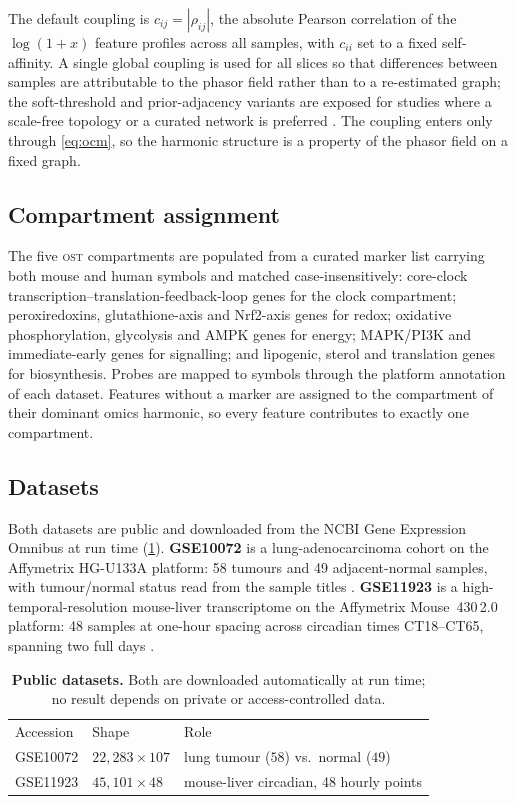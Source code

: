 \documentclass[preprint,12pt,amsmath,amssymb,superscriptaddress,floatfix]{revtex4-2}
\theoremstyle{definition}
\theoremstyle{plain}
\newcommand{\OST}{\textsc{ost}}
\begin{document}
The default coupling is $c_{ij}=|\rho_{ij}|$, the absolute Pearson correlation of
the $\log(1+x)$ feature profiles across all samples, with $c_{ii}$ set to a
fixed self-affinity. A single global coupling is used for all slices so that
differences between samples are attributable to the phasor field rather than to a
re-estimated graph; the soft-threshold and prior-adjacency variants are exposed
for studies where a scale-free topology or a curated network is preferred
\citep{langfelder2008wgcna, barabasi2011network}. The coupling enters only
through \cref{eq:ocm}, so the harmonic structure is a property of the phasor
field on a fixed graph.

\subsection{Compartment assignment}

The five \OST{} compartments are populated from a curated marker list carrying
both mouse and human symbols and matched case-insensitively: core-clock
transcription--translation-feedback-loop genes for the clock compartment;
peroxiredoxins, glutathione-axis and Nrf2-axis genes for redox; oxidative
phosphorylation, glycolysis and AMPK genes for energy; MAPK/PI3K and
immediate-early genes for signalling; and lipogenic, sterol and translation genes
for biosynthesis. Probes are mapped to symbols through the platform annotation of
each dataset. Features without a marker are assigned to the compartment of their
dominant omics harmonic, so every feature contributes to exactly one compartment.

\subsection{Datasets}

Both datasets are public and downloaded from the NCBI Gene Expression Omnibus
\citep{edgar2002geo} at run time (\cref{tab:data}). \textbf{GSE10072} is a
lung-adenocarcinoma cohort on the Affymetrix HG-U133A platform: 58 tumours and 49
adjacent-normal samples, with tumour/normal status read from the sample titles
\citep{landi2008gene}. \textbf{GSE11923} is a high-temporal-resolution
mouse-liver transcriptome on the Affymetrix Mouse~430\,2.0 platform: 48 samples
at one-hour spacing across circadian times CT18--CT65, spanning two full days
\citep{hughes2009harmonics}.

\begin{table}[htbp]
\centering
\caption{\textbf{Public datasets.} Both are downloaded automatically at run time;
no result depends on private or access-controlled data.}
\label{tab:data}
\small
\begin{ruledtabular}
\begin{tabular}{lll}
Accession & Shape & Role \\
\colrule
GSE10072 & $22{,}283\times107$ & lung tumour ($58$) vs.\ normal ($49$) \\
GSE11923 & $45{,}101\times48$  & mouse-liver circadian, 48 hourly points \\
\end{tabular}
\end{ruledtabular}
\end{table}
\end{document}
